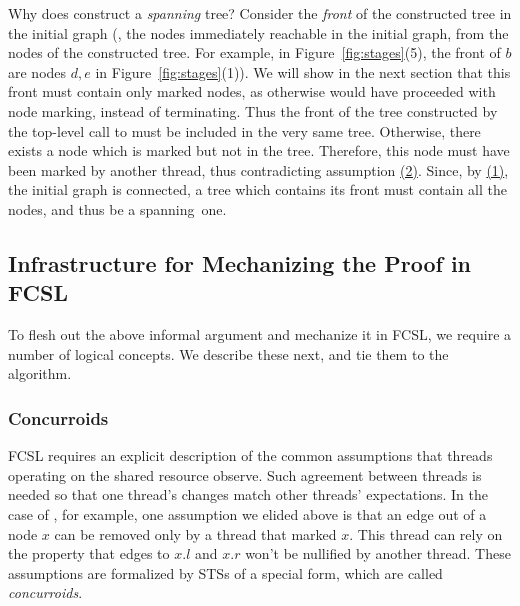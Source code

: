 Why does  construct a \emph{spanning} tree? Consider the
{\em front} of the constructed tree in the initial graph (\ie, the
nodes immediately reachable in the initial graph, from the nodes of
the constructed tree. For example, in Figure~\ref{fig:stages}(5), the
front of $b$ are nodes $d, e$ in Figure~\ref{fig:stages}(1)). We will
show in the next section that this front must contain only marked
nodes, as otherwise  would have proceeded with node
marking, instead of terminating. Thus the front of the tree
constructed by the top-level call to  must be
included in the very same tree. Otherwise, there exists a node which
is marked but not in the tree. Therefore, this node must have been
marked by another thread, thus contradicting assumption
\hyperlink{asm2}{(2)}. Since, by \hyperlink{asm1}{(1)}, the initial
graph is connected, a tree which contains its front must contain all
the nodes, and thus be a spanning~one.


\subsection{Infrastructure for Mechanizing the Proof in FCSL}
\label{sec:inform-proof-devel}

To flesh out the above informal argument and mechanize it in FCSL, we
require a number of logical concepts. We describe these next, and tie
them to the  algorithm.


\subsubsection{Concurroids}
\label{sec:conc-graph-prot}

FCSL requires an explicit description of the common assumptions that
threads operating on the shared resource observe. Such agreement
between threads is needed so that one thread's changes match other
threads' expectations. In the case of , for example, one
assumption we elided above is that an edge out of a node $x$ can be
removed only by a thread that marked $x$. This thread can rely on the
property that edges to $x.l$ and $x.r$ won't be nullified by another
thread. These assumptions are formalized by STSs of a special form,
which are called \emph{concurroids}.


